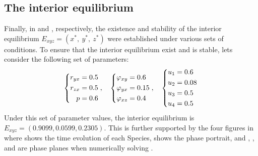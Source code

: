 \subsection{The interior equilibrium}\label{subsec:numsim_interior_equilibrium}
Finally, in  and , respectively, the existence and stability
of the interior equilibrium $E_{xyz}=\left(x^*,\ y^*,\ z^*\right)$ were established under various sets of conditions. To ensure that the interior equilibrium exist and is stable, lets consider the following set of parameters:
\begin{equation}\label{params:interior-a}
    \begin{dcases}
        \begin{aligned}
            r_{yx} &= 0.5\\
            r_{zx} &= 0.5\\
            p &= 0.6
        \end{aligned}
    \end{dcases},\quad 
    \begin{dcases}
        \begin{aligned}
            \varphi_{xy} &= 0.6\\
            \varphi_{yx} &= 0.15\\
            \varphi_{xz} &= 0.4
        \end{aligned}
    \end{dcases},\quad
    \begin{dcases}
        \begin{aligned}
            u_1 &= 0.6\\
            u_2 &= 0.08\\
            u_3 &= 0.5\\
            u_4 &= 0.5
        \end{aligned}
    \end{dcases}
\end{equation}
Under this set of parameter values, the interior equilibrium is $E_{xyz}=(0.9099,0.0599,0.2305)$. This is further supported by the four figures in  where  shows the time evolution of each Species,  shows the phase portrait, and , , and  are phase planes when numerically solving .

